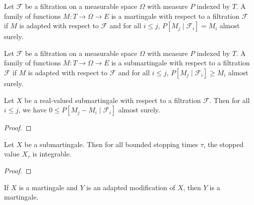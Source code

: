 \begin{definition}[Martingale]\label{def:Martingale}
  \mathlibok
Let $\mathcal{F}$ be a filtration on a measurable space $\Omega$ with measure $P$ indexed by $T$.
A family of functions $M : T \to \Omega \to E$ is a martingale with respect to a filtration $\mathcal{F}$ if $M$ is adapted with respect to $\mathcal{F}$ and for all $i \le j$, $P[M_j \mid \mathcal{F}_i] = M_i$ almost surely.
\end{definition}


\begin{definition}[Submartingale]\label{def:Submartingale}
  \mathlibok
Let $\mathcal{F}$ be a filtration on a measurable space $\Omega$ with measure $P$ indexed by $T$.
A family of functions $M : T \to \Omega \to E$ is a submartingale with respect to a filtration $\mathcal{F}$ if $M$ is adapted with respect to $\mathcal{F}$ and for all $i \le j$, $P[M_j \mid \mathcal{F}_i] \ge M_i$ almost surely.
\end{definition}

\begin{lemma}\label{lem:condExp_sub_nonneg}
  \mathlibok
Let $X$ be a real-valued submartingale with respect to a filtration $\mathcal{F}$. Then for all $i \le j$, we have $0 \le P[M_j - M_i \mid \mathcal{F}_i]$ almost surely.
\end{lemma}

\begin{proof}\mathlibok

\end{proof}


\begin{lemma}\label{lem:Submartingale.integrable_stoppedValue}
  \mathlibok
Let $X$ be a submartingale. Then for all bounded stopping times $\tau$, the stopped value $X_\tau$ is integrable.
\end{lemma}

\begin{proof}\leanok

\end{proof}


\begin{lemma}\label{lem:Martingale.congr}
  \leanok
If $X$ is a martingale and $Y$ is an adapted modification of $X$, then $Y$ is a martingale.
\end{lemma}

